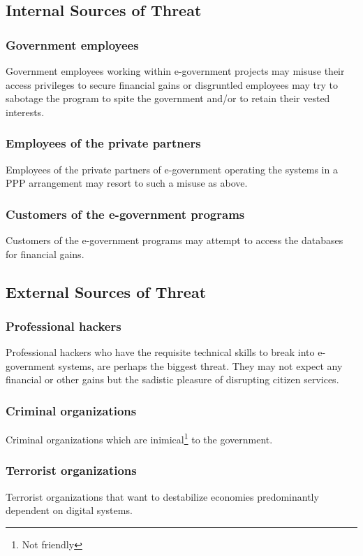  \subsection{Internal Sources of Threat}
 
 \subsubsection*{Government employees}
 Government employees working within e-government projects may misuse their access privileges to secure financial gains or disgruntled employees may try to sabotage the program to spite the government and/or to retain their vested interests.
 
 \subsubsection*{Employees of the private partners}
 Employees of the private partners of e-government operating the systems in a PPP arrangement may resort to such a misuse as above.
 
 \subsubsection*{Customers of the e-government programs}
 Customers of the e-government programs may attempt to access the databases for financial gains.
 
 
 \subsection{External Sources of Threat}
 
 \subsubsection*{Professional hackers}
 Professional hackers who have the requisite technical skills to break into e-government systems, are perhaps the biggest threat. They may not expect any financial or other gains but the sadistic pleasure of disrupting citizen services.
 
 \subsubsection*{Criminal organizations}
 Criminal organizations which are inimical\footnote{Not friendly} to the government.
 
 \subsubsection*{Terrorist organizations} 
 Terrorist organizations that want to destabilize economies predominantly dependent on digital systems.
 
